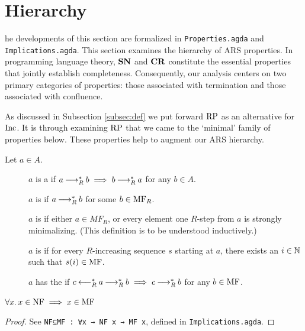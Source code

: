 \section{Hierarchy}
\label{sec:Hierarchy}

\newenvironment{counterexample}[1][]{%
    \refstepcounter{CEcounter} %
    \noindent \scriptsize\textbf{{\theCEcounter } }  #1\par
}

The developments of this section are formalized in
\texttt{Properties.agda} and
\texttt{Implications.agda}. This section examines the hierarchy of ARS properties.
In programming language theory, $\mathbf{SN}$ and $\mathbf{CR}$ constitute the essential properties that
jointly establish completeness.
Consequently, our analysis centers on two primary categories of properties: those associated
with termination and those associated with confluence.

As discussed in Subsection \ref{subsec:def} we put forward $\mathrm{RP}$ as an alternative for $\mathrm{Inc}$. It is through examining $\mathrm{RP}$ that
we came to the `minimal' family of properties below. These properties help to augment our ARS hierarchy.

\begin{definition}\label{def:mf} Let $a \in A$. \hfill
    \begin{description}
        \item[\bq {}] $a$ is a  if $a \mathbin{\longrightarrow_R^*} b \implies b \mathbin{\longrightarrow_R^*} a$ for any $b \in A$.
        \item[\bq {}] $a$ is  if $a \mathbin{\longrightarrow_R^*} b$ for some $b \in \mathrm{MF}_R$.
        \item[\bq {}]  $a$ is  if either $a \in MF_R$, or every element one $R$-step from $a$ is strongly minimalizing. (This
        definition is to be understood inductively.)
        \item[\bq {}] $a$ is  if for every $R$-increasing sequence $s$ starting at $a$, there exists
        an $i \in \mathbb{N}$ such that $s (i) \in \mathrm{MF}$.
        \item[\bq {}] $a$ has the  if $c \mathbin{\longleftarrow_R^*} a \mathbin{\longrightarrow_R^*} b \implies c \mathbin{\longrightarrow_R^*} b$ for any $b \in \mathrm{MF}$.
    \end{description}
\end{definition}

\begin{proposition}\label{prop:nftomf}
    $\forall x.\, x\in \mathrm{NF} \implies x \in \mathrm{MF}$
\end{proposition}
\begin{proof}
    See \verb|NF⊆MF : ∀x → NF x → MF x|, defined in \texttt{Implications.agda}.
\end{proof}

